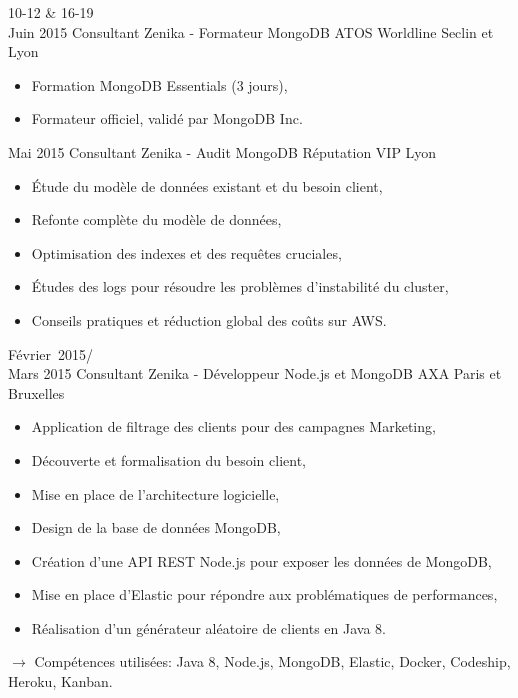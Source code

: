 \documentclass[11pt,a4paper]{moderncv}
\begin{document}
\cventry
{10-12 \& 16-19\\ Juin 2015}
{Consultant Zenika - Formateur MongoDB}
{ATOS Worldline}
{Seclin et Lyon}
{}
{\begin{itemize}
\item Formation MongoDB Essentials (3 jours),
\item Formateur officiel, validé par MongoDB Inc.
\end{itemize}
}   %

\cventry
{Mai 2015}
{Consultant Zenika - Audit MongoDB}
{Réputation VIP}
{Lyon}
{}
{\begin{itemize}
\item \'Etude du modèle de données existant et du besoin client,
\item Refonte complète du modèle de données,
\item Optimisation des indexes et des requêtes cruciales,
\item \'Etudes des logs pour résoudre les problèmes d'instabilité du cluster,
\item Conseils pratiques et réduction global des coûts sur AWS.
\end{itemize}
}   %

\cventry
{Février\ 2015/\\Mars 2015}
{Consultant Zenika - Développeur Node.js et MongoDB}
{AXA}
{Paris et Bruxelles}
{}
{\begin{itemize}
\item Application de filtrage des clients pour des campagnes Marketing,
\item Découverte et formalisation du besoin client,
\item Mise en place de l'architecture logicielle,
\item Design de la base de données MongoDB,
\item Création d'une API REST Node.js pour exposer les données de MongoDB,
\item Mise en place d'Elastic pour répondre aux problématiques de performances,
\item Réalisation d'un générateur aléatoire de clients en Java 8.
\end{itemize}
$\rightarrow$ Compétences utilisées: Java 8, Node.js, MongoDB, Elastic, Docker, Codeship, Heroku, Kanban.
}   %
\end{document}
